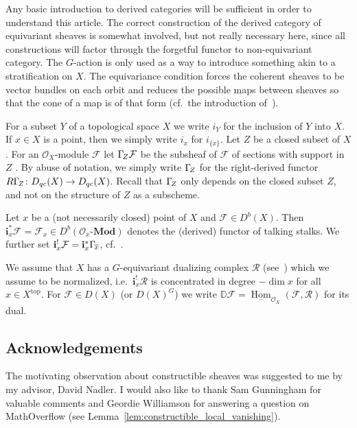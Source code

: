 \documentclass{compositio}
\theoremstyle{plain}
\theoremstyle{definition}
\theoremstyle{remark}
\newcommand\sheaf{\mathcal}
\newcommand\sO{\sheaf{O}}
\newcommand\cat{\mathbf}
\newcommand\catModules[1]{#1\text{-}\cat{Mod}}
\newcommand\sheafHom{\underline{\operatorname{Hom}}}
\newcommand\dualize{\mathbb D}
\newcommand\lc[1]{\Gamma_{\mkern-3mu#1}}
\begin{document}
\begin{cgs}
    Any basic introduction to derived categories will be sufficient in order to understand this article.
    The correct construction of the derived category of equivariant sheaves is somewhat involved, but not really necessary here, since all constructions will factor through the forgetful functor to non-equivariant category.
    The $G$-action is only used as a way to introduce something akin to a stratification on $X$.
    The equivariance condition forces the coherent sheaves to be vector bundles on each orbit and reduces the possible maps between sheaves so that the cone of a map is of that form (cf.~the introduction of~\cite{ArinkinBezrukavnikov:arXiv:PerverseCoherentSheaves}).
\end{cgs}

For a subset $Y$ of a topological space $X$ we write $i_Y$ for the inclusion of $Y$ into $X$. 
If $x \in  X$ is a point, then we simply write $i_x$ for $i_{\{x\}}$.
Let $Z$ be a closed subset of $X$.
For an $\sO_X$-module $\sheaf F$ let $\lc Z\sheaf F$ be the subsheaf of $\sheaf F$ of sections with support in $Z$ \cite[Variation~3 in IV.1]{Hartshorne:1966:ResiduesAndDuality}.
By abuse of notation, we simply write $\lc Z$ for the right-derived functor $R\lc Z\colon D_{qc}(X) \to  D_{qc}(X)$.
Recall that $\lc Z$ only depends on the closed subset $Z$, and not on the structure of $Z$ as a subscheme.

Let $x$ be a (not necessarily closed) point of $X$ and $\sheaf F \in  D^b(X)$.
Then $\mathbf i_x^*\sheaf F = \sheaf F_x \in  D^b(\catModules{\sO_x})$ denotes the (derived) functor of talking stalks.
We further set $\mathbf i_x^!\sheaf F = \mathbf i_x^*\lc {\overline x}$, cf.~\cite[Variation~8 in IV.1]{Hartshorne:1966:ResiduesAndDuality}.

We assume that $X$ has a $G$-equivariant dualizing complex $\sheaf R$ (see~\cite[Definition~1]{Bezrukavnikov:arXiv:PerverseCoherentSheaves}) which we assume to be normalized, i.e.\ $\mathbf i_x^! \sheaf R$ is concentrated in degree $-\dim x$ for all $x \in  X^{\mathrm{top}}$.
For $\sheaf F \in  D(X)$ (or $D(X)^G$) we write $\dualize \sheaf F = \sheafHom_{\sO_X}(\sheaf F,\sheaf R)$ for its dual.

\subsection{Acknowledgements}

The motivating observation about constructible sheaves was suggested to me by my advisor, David Nadler.
I would also like to thank Sam Gunningham for valuable comments and Geordie Williamson for answering a question on MathOverflow (see Lemma~\ref{lem:constructible_local_vanishing}).
\end{document}
